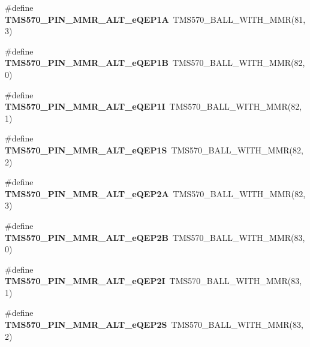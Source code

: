 \begin{DoxyCompactItemize}
\mbox{\label{tms570lc4357-pins_8h_a1ecb86f8d7675e649e691ad4ec3d5060}} 
\#define {\bfseries T\+M\+S570\+\_\+\+P\+I\+N\+\_\+\+M\+M\+R\+\_\+\+A\+L\+T\+\_\+e\+Q\+E\+P1A}~T\+M\+S570\+\_\+\+B\+A\+L\+L\+\_\+\+W\+I\+T\+H\+\_\+\+M\+MR(81, 3)
\item 
\mbox{\label{tms570lc4357-pins_8h_a1c7ff00d6d3c4c98acbefc1645102755}} 
\#define {\bfseries T\+M\+S570\+\_\+\+P\+I\+N\+\_\+\+M\+M\+R\+\_\+\+A\+L\+T\+\_\+e\+Q\+E\+P1B}~T\+M\+S570\+\_\+\+B\+A\+L\+L\+\_\+\+W\+I\+T\+H\+\_\+\+M\+MR(82, 0)
\item 
\mbox{\label{tms570lc4357-pins_8h_aff7619e790dbbd1cc19f552418ea3be7}} 
\#define {\bfseries T\+M\+S570\+\_\+\+P\+I\+N\+\_\+\+M\+M\+R\+\_\+\+A\+L\+T\+\_\+e\+Q\+E\+P1I}~T\+M\+S570\+\_\+\+B\+A\+L\+L\+\_\+\+W\+I\+T\+H\+\_\+\+M\+MR(82, 1)
\item 
\mbox{\label{tms570lc4357-pins_8h_af086d0d99970335337e1f4d851551182}} 
\#define {\bfseries T\+M\+S570\+\_\+\+P\+I\+N\+\_\+\+M\+M\+R\+\_\+\+A\+L\+T\+\_\+e\+Q\+E\+P1S}~T\+M\+S570\+\_\+\+B\+A\+L\+L\+\_\+\+W\+I\+T\+H\+\_\+\+M\+MR(82, 2)
\item 
\mbox{\label{tms570lc4357-pins_8h_a97d9737db71c338d57130c5357c25968}} 
\#define {\bfseries T\+M\+S570\+\_\+\+P\+I\+N\+\_\+\+M\+M\+R\+\_\+\+A\+L\+T\+\_\+e\+Q\+E\+P2A}~T\+M\+S570\+\_\+\+B\+A\+L\+L\+\_\+\+W\+I\+T\+H\+\_\+\+M\+MR(82, 3)
\item 
\mbox{\label{tms570lc4357-pins_8h_a3804a330a0d9bb0529fafcba4923403a}} 
\#define {\bfseries T\+M\+S570\+\_\+\+P\+I\+N\+\_\+\+M\+M\+R\+\_\+\+A\+L\+T\+\_\+e\+Q\+E\+P2B}~T\+M\+S570\+\_\+\+B\+A\+L\+L\+\_\+\+W\+I\+T\+H\+\_\+\+M\+MR(83, 0)
\item 
\mbox{\label{tms570lc4357-pins_8h_a1346759974dca41a30ac4b2f2c704242}} 
\#define {\bfseries T\+M\+S570\+\_\+\+P\+I\+N\+\_\+\+M\+M\+R\+\_\+\+A\+L\+T\+\_\+e\+Q\+E\+P2I}~T\+M\+S570\+\_\+\+B\+A\+L\+L\+\_\+\+W\+I\+T\+H\+\_\+\+M\+MR(83, 1)
\item 
\mbox{\label{tms570lc4357-pins_8h_a7e02233a407013bbf7171b49b49aa2d8}} 
\#define {\bfseries T\+M\+S570\+\_\+\+P\+I\+N\+\_\+\+M\+M\+R\+\_\+\+A\+L\+T\+\_\+e\+Q\+E\+P2S}~T\+M\+S570\+\_\+\+B\+A\+L\+L\+\_\+\+W\+I\+T\+H\+\_\+\+M\+MR(83, 2)

\end{DoxyCompactItemize}

